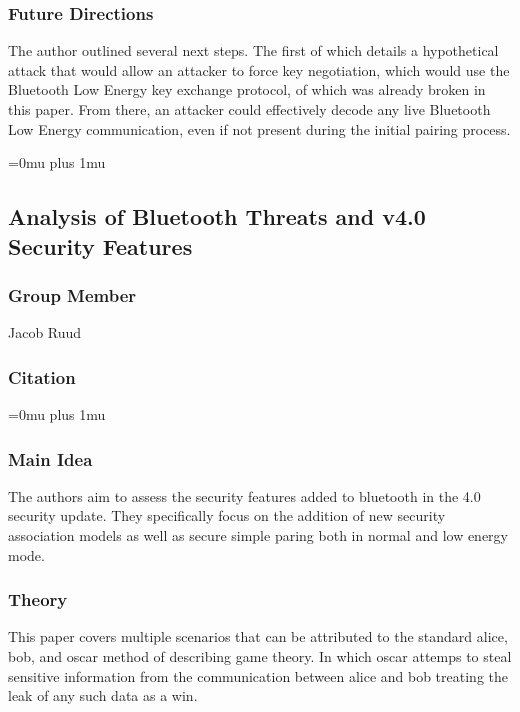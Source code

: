 \subsubsection{Future Directions}

\noindent
The author outlined several next steps.  The first of which details a hypothetical attack that would allow an attacker to force key negotiation, which would use the Bluetooth Low Energy key exchange protocol, of which was already broken in this paper.  From there, an attacker could effectively decode any live Bluetooth Low Energy communication, even if not present during the initial pairing process.

\Urlmuskip=0mu plus 1mu\relax

\noindent
\subsection{{A}nalysis of {B}luetooth {T}hreats and v4.0 {S}ecurity {F}eatures}

\subsubsection{Group Member}

\noindent
Jacob Ruud

\noindent
\subsubsection{Citation}

\Urlmuskip=0mu plus 1mu\relax

\subsubsection{Main Idea}

\noindent
The authors aim to assess the security features added to bluetooth in the 4.0 security update. They specifically focus on the addition of new security association models as well as secure simple paring both in normal and low energy mode.

\subsubsection{Theory}

\noindent
This paper covers multiple scenarios that can be attributed to the standard alice, bob, and oscar method of describing game theory. In which oscar attemps to steal sensitive information from the communication between alice and bob treating the leak of any such data as a win.

